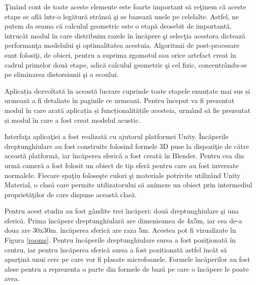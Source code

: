 	
	\c{T}in\^{a}nd cont de toate aceste elemente este foarte important s\u{a} re\c{t}inem c\u{a} aceste etape se afl\u{a} \^{i}ntr-o leg\u{a}tur\u{a} str\^{a}ns\u{a} \c{s}i se bazeaz\u{a} unele pe celelalte. Astfel, ne putem da seama c\u{a} calculul geometric este o etap\u{a} deosebit de important\u{a}, \^{i}ntruc\^{a}t modul \^{i}n care distribuim razele \^{i}n \^{i}nc\u{a}pere \c{s}i selec\c{t}ia acestora dicteaz\u{a} performan\c{t}a modelului \c{s}i optimalitatea acestuia. Algoritmii de post-procesare sunt folosi\c{t}i, de obicei, pentru a suprima zgomotul sau orice artefact creat \^{i}n cadrul primelor dou\u{a} etape, adic\u{a} calculul geometric \c{s}i cel fizic, concentr\^{a}ndu-se pe eliminarea distorsiunii \c{s}i a ecoului.
	
	Aplicația dezvoltată în această lucrare cuprinde toate etapele enunțate mai sus și urmează a fi detaliate în paginile ce urmează. Pentru început va fi prezentat modul în care arată aplicația și funcționalitățile acesteia, urmând să fie prezentat și modul în care a fost creat modelul acustic.
	
	Interfa\c{t}a aplica\c{t}iei a fost realizat\u{a} cu ajutorul platformei Unity. \^{I}nc\u{a}perile dreptunghiulare au fost construite folosind formele 3D puse la dispozi\c{t}ie de c\u{a}tre aceast\u{a} platform\u{a}, iar \^{i}nc\u{a}perea sferic\u{a} a fost creat\u{a} \^{i}n Blender. Pentru cea din urm\u{a} camer\u{a} a fost folosit un obiect de tip sfer\u{a} pentru care au fost inversate normalele. Fiecare spa\c{t}iu folose\c{s}te culori \c{s}i materiale potrivite utiliz\^{a}nd Unity Material, o clas\u{a} care permite utilizatorului s\u{a} animeze un obiect prin intermediul propriet\u{a}\c{t}ilor de care dispune aceast\u{a} clas\u{a}.
	
	Pentru acest studiu au fost g\^{a}ndite trei \^{i}nc\u{a}peri: dou\u{a} dreptunghiulare \c{s}i una sferic\u{a}. Prima \^{i}nc\u{a}pere dreptunghiular\u{a} are dimenisunea de 4x5m, iar cea de-a doua are 30x30m. \^{i}nc\u{a}perea sferic\u{a} are raza 5m. Acestea pot fi vizualizate \^{i}n Figura \ref{rooms}. Pentru \^{i}nc\u{a}perile dreptunghiulare sursa a fost pozi\c{t}ionat\u{a} \^{i}n centru, iar pentru \^{i}nc\u{a}perea sferic\u{a} sursa a fost pozitionat\u{a} astfel \^{i}nc\^{a}t s\u{a} apar\c{t}in\u{a} unui cerc pe care vor fi plasate microfoanele. Formele încăperilor au fost alese pentru a reprezenta o parte din formele de bază pe care o încăpere le poate avea.
	
